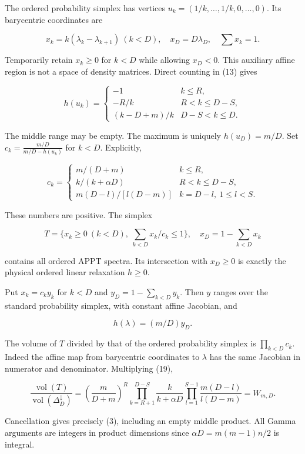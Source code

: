 \documentclass[
  11pt,
]{article}
\begin{document}
The ordered probability simplex has vertices
\(u_k=(1/k,\ldots,1/k,0,\ldots,0)\). Its barycentric coordinates are

\[
x_k=k(\lambda_k-\lambda_{k+1})\ (k<D),\quad x_D=D\lambda_D,\quad\sum x_k=1.
\tag{17}
\]

Temporarily retain \(x_k\geq0\) for \(k<D\) while allowing \(x_D<0\).
This auxiliary affine region is not a space of density matrices. Direct
counting in (13) gives

\[
h(u_k)=\begin{cases}-1&k\leq R,\\-R/k&R<k\leq D-S,\\(k-D+m)/k&D-S<k\leq D.\end{cases}
\tag{18}
\]

The middle range may be empty. The maximum is uniquely \(h(u_D)=m/D\).
Set \(c_k=\frac{m/D}{m/D-h(u_k)}\) for \(k<D\). Explicitly,

\[
c_k=\begin{cases}
m/(D+m)&k\leq R,\\
k/(k+\alpha D)&R<k\leq D-S,\\
m(D-l)/[l(D-m)]&k=D-l,\ 1\leq l<S.
\end{cases}
\tag{19}
\]

These numbers are positive. The simplex

\[
T=\{x_k\geq0\ (k<D),\ \sum_{k<D}x_k/c_k\leq1\},\quad x_D=1-\sum_{k<D}x_k
\tag{20}
\]

contains all ordered APPT spectra. Its intersection with \(x_D\geq0\) is
exactly the physical ordered linear relaxation \(h\geq0\).

Put \(x_k=c_ky_k\) for \(k<D\) and \(y_D=1-\sum_{k<D}y_k\). Then \(y\)
ranges over the standard probability simplex, with constant affine
Jacobian, and

\[
h(\lambda)=(m/D)y_D.
\tag{21}
\]

The volume of \(T\) divided by that of the ordered probability simplex
is \(\prod_{k<D}c_k\). Indeed the affine map from barycentric
coordinates to \(\lambda\) has the same Jacobian in numerator and
denominator. Multiplying (19),

\[
\frac{\operatorname{vol}(T)}{\operatorname{vol}(\Delta_D^{\downarrow})}
=\left(\frac m{D+m}\right)^R
 \prod_{k=R+1}^{D-S}\frac{k}{k+\alpha D}
 \prod_{l=1}^{S-1}\frac{m(D-l)}{l(D-m)}=W_{m,D}.
\tag{22}
\]

Cancellation gives precisely (3), including an empty middle product. All
Gamma arguments are integers in product dimensions since
\(\alpha D=m(m-1)n/2\) is integral.
\end{document}
